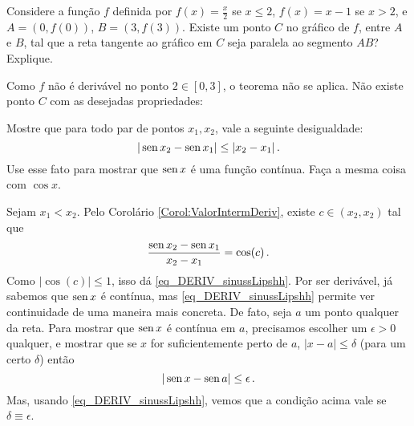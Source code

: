 \begin{exo}
Considere a função $f$ definida por $f(x)=\frac{x}{2}$ se $x\leq 2$, $f(x)=x-1$
se $x>2$, e $A=(0,f(0))$, $B=(3,f(3))$. Existe um
ponto $C$ no gráfico de $f$, entre $A$ e $B$, tal que a reta tangente ao
gráfico em $C$ seja paralela ao segmento $AB$?
Explique.
\begin{sol}
Como $f$ não é derivável no ponto $2\in [0,3]$, o teorema não se aplica. Não
existe ponto $C$ com as desejadas propriedades:
\begin{center}
\begin{bmlimage}\end{bmlimage}
\end{center}

\end{sol}
\end{exo}

\begin{exo}\label{exo_DERIV_senoLipschitz}
Mostre que para todo par de pontos $x_1,x_2$, 
vale a seguinte desigualdade:
\begin{equation}\label{eq_DERIV_sinussLipshh} 
|\operatorname{sen} x_2-\operatorname{sen} x_1|\leq |x_2-x_1|\,.
\end{equation}
Use esse fato para mostrar que $\operatorname{sen} x$ é uma função contínua.
Faça a mesma coisa com $\cos x$.
\begin{sol}
Sejam $x_1<x_2$. Pelo Corolário \ref{Corol:ValorIntermDeriv}, existe $c\in
(x_2,x_2)$ tal que
\[
\frac{\operatorname{sen} x_2-\operatorname{sen} x_1}{x_2-x_1}=\cos(c)\,.
\]
Como $|\cos (c)|\leq 1$, isso dá \eqref{eq_DERIV_sinussLipshh}.
Por ser derivável, já sabemos que $\operatorname{sen} x$ é contínua, mas \eqref{eq_DERIV_sinussLipshh} 
permite ver continuidade de uma maneira mais concreta. De fato, 
seja $a$ um ponto qualquer da reta. Para mostrar que $\operatorname{sen} x$ é contínua em
$a$, precisamos escolher um $\epsilon>0$ qualquer, e mostrar que se $x$ for
suficientemente perto de $a$, $|x-a|\leq \delta$ (para um certo $\delta$) então 
\[ 
|\operatorname{sen} x-\operatorname{sen} a|\leq \epsilon\,.
\]
Mas, usando \eqref{eq_DERIV_sinussLipshh}, vemos que a condição acima
vale se $\delta\equiv \epsilon$.
\end{sol}
\end{exo}

